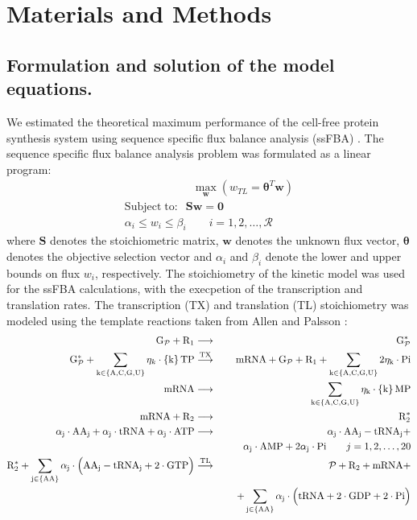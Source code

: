 \documentclass[journal=asbcd6,manuscript=article]{achemso}
\begin{document}
\section*{Materials and Methods}

\subsection*{Formulation and solution of the model equations.}
We estimated the theoretical maximum performance of the cell-free protein synthesis system using sequence specific flux balance analysis (ssFBA) \cite{Allen:2003aa}.
The sequence specific flux balance analysis problem was formulated as a linear program:
\begin{equation}
 \begin{multlined}
	\qquad \qquad \qquad \max_{\boldsymbol{w}}{} \! \left( w_{TL} = \mathbf{\boldsymbol{\theta}}^T \boldsymbol{w} \right) \\
	\mathrm{Subject \; to:}
	 \; \; \mathbf{S}\mathbf{w}=\mathbf{0} \\
\alpha_i \leq w_i \leq \beta_i  \qquad i=1,2,\hdots,\mathcal{R}
 \end{multlined}
\end{equation}
where $\mathbf{S}$ denotes the stoichiometric matrix, $\mathbf{w}$ denotes the unknown flux vector, $\boldsymbol{\theta}$ denotes the objective selection vector
and $\alpha_i$ and $\beta_i$ denote the lower and upper bounds on flux $w_{i}$, respectively.
The stoichiometry of the kinetic model was used for the ssFBA calculations, with the execpetion of the transcription and translation rates.
The transcription (TX) and translation (TL) stoichiometry was modeled using the template reactions taken from Allen and Palsson \cite{Allen:2003aa}:
\begin{eqnarray*}
\mathrm{{G}_{\mathcal{P}}}+\mathrm{{R}_{1}} &\longrightarrow& \mathrm{G_{\mathcal{P}}^{*}} \\
\mathrm{G_{\mathcal{P}}^{*}}+\sum_{\mathrm{k\in\left\{A,C,G,U\right\}}}\eta_{k}\cdot \mathrm{\left\{k\right\}TP} &\overset{\rm TX}{\longrightarrow}& \mathrm{mRNA}+\mathrm{G_{\mathcal{P}}}+\mathrm{R_{1}}+ \mathrm{\sum_{k\in\left\{A,C,G,U\right\}}2\eta_{k}\cdot Pi}\\
\mathrm{mRNA} &\longrightarrow& \mathrm{\sum_{k\in\left\{A,C,G,U\right\}}\eta_{k}\cdot \left\{k\right\}MP} \\
\mathrm{mRNA}+\mathrm{R_{2}} &\longrightarrow& \mathrm{R_{2}^{*}} \\
\mathrm{\alpha_{j}\cdot AA_{j}+\alpha_{j}\cdot tRNA+\alpha_{j}\cdot ATP} &\longrightarrow& \mathrm{\alpha_{j}\cdot AA_{j}-tRNA_{j}+}\\
&& \mathrm{\qquad \alpha_{j}\cdot AMP+2\alpha_{j}\cdot Pi} \qquad{j=1,2,\hdots,20}\\
\mathrm{R_{2}^{*}+\sum_{j\in\left\{AA\right\}}\alpha_{j}\cdot \Big(AA_{j}-tRNA_{j}+2\cdot GTP\Big)} &\stackrel{\rm TL}{\longrightarrow}& \mathcal{P}+\mathrm{R_{2}+mRNA}+\\
&& \mathrm{\quad +\sum_{j\in\left\{AA\right\}}\alpha_{j}\cdot\Big(tRNA+2\cdot GDP+2\cdot Pi\Big)}
\end{eqnarray*}
\end{document}
